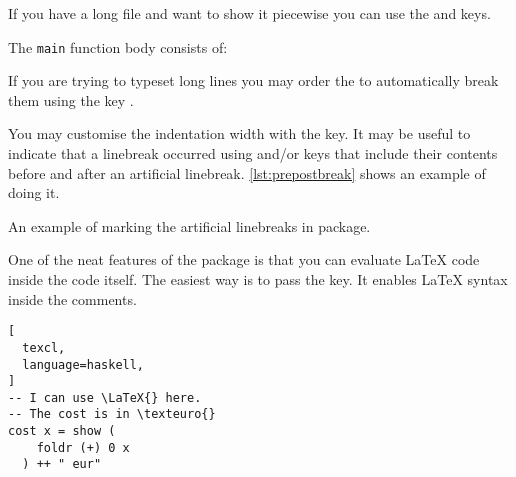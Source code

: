 If you have a long file and want to show it piecewise you can use the
 and  keys.
\begin{example}[examplewidth=0.6\linewidth]
The \lstinline|main|
function body
consists of:

\end{example}

If you are trying to typeset long lines you may order the  to
automatically break them using the key .
\begin{example}[examplewidth=0.6\linewidth]

\end{example}
You may customise the indentation width with the  key. It
may be useful to indicate that a linebreak occurred using 
and/or  keys that include their contents before and after an
artificial linebreak. \autoref{lst:prepostbreak} shows an example of doing it.
\begin{listing}
  \begin{example}[examplewidth=0.6\linewidth, vertical_mode]

\end{example}
  \caption{An example of marking the artificial linebreaks in 
    package.}\label{lst:prepostbreak}
\end{listing}

One of the neat features of the  package is that you can evaluate
\LaTeX{} code inside the code itself. The easiest way is to pass the
 key. It enables \LaTeX{} syntax inside the comments.
\begin{example}
\begin{lstlisting}[
  texcl,
  language=haskell,
]
-- I can use \LaTeX{} here.
-- The cost is in \texteuro{}
cost x = show (
    foldr (+) 0 x
  ) ++ " eur"
\end{lstlisting}
\end{example}

